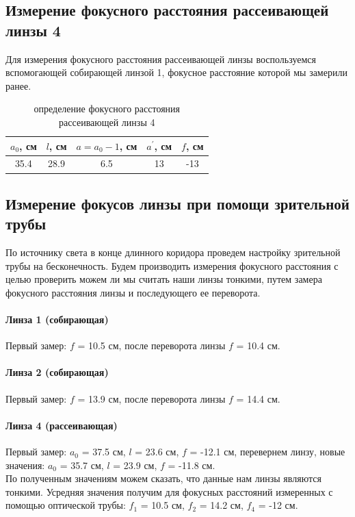 \documentclass[a4paper, 12pt]{article}%
\begin{document}
	\subsection{Измерение фокусного расстояния рассеивающей линзы 4}
	Для измерения фокусного расстояния рассеивающей линзы воспользуемся вспомогающей собирающей линзой 1, фокусное расстояние которой мы замерили ранее.
	\begin{table}[H]
		\centering
		\begin{tabular}{|c|c|c|c|c|}
			\hline
		$a_0$, см	&  $l$, см    &   $a = a_0 - 1 $, см  & $a^\prime$, см   & $f$, см    \\ \hline
			35.4 & 28.9 & 6.5 & 13 & -13 \\ \hline
		\end{tabular}
		\caption{определение фокусного расстояния рассеивающей линзы 4}
	\end{table}
	\subsection{Измерение фокусов линзы при помощи зрительной трубы}
	По источнику света в конце длинного коридора проведем настройку зрительной трубы на бесконечность. Будем производить измерения фокусного расстояния с целью проверить можем ли мы считать наши линзы тонкими, путем замера фокусного расстояния линзы и последующего ее переворота.
	\paragraph{Линза 1 (собирающая)} 
	Первый замер: $f$ = 10.5 см, после переворота линзы $f$ = 10.4 см.
	\paragraph{Линза 2 (собирающая)} 
	Первый замер: $f$ = 13.9 см, после переворота линзы $f$ = 14.4 см.
	\paragraph{Линза 4 (рассеивающая)} 
	Первый замер: $a_0$ = 37.5 см, $l$ = 23.6 см, $f$ = -12.1 см, перевернем линзу, новые значения: $a_0$ = 35.7 см, $l$ = 23.9 см, $f$ = -11.8 см.\\
	
	По полученным значениям можем сказать, что данные нам линзы являются тонкими.
	Усредняя значения получим для фокусных расстояний измеренных с помощью оптической трубы: $f_1$ = 10.5 см, $f_2$ = 14.2 см, $f_4$ = -12 см.
\end{document}
